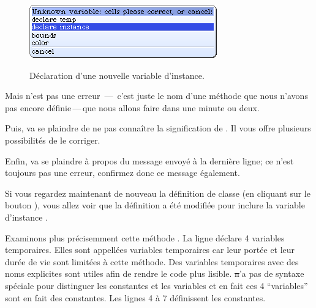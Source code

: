 \documentclass[a4paper,10pt,twoside]{book}
\begin{document}
\begin{figure}[htb]
\begin{minipage}{0.64\textwidth}
		{\includegraphics[scale=0.7]{DeclareInstanceVar}}
	\caption{Déclaration d'une nouvelle variable d'instance.\label{fig:declareInstance}}
\end{minipage}
\end{figure}

Mais  n'est pas une erreur \,---\, c'est juste le nom d'une méthode que nous n'avons pas encore définie\,---\,que nous allons faire dans une minute ou deux.


Puis, \squeak va se plaindre de ne pas connaître la signification de . Il vous offre plusieurs possibilités de le corriger.

Enfin, \squeak va se plaindre à propos du message  envoyé à la dernière ligne; ce n'est toujours pas une erreur, confirmez donc ce message également.

Si vous regardez maintenant de nouveau la définition de classe (en cliquant sur le bouton ), vous allez voir que la définition a été modifiée pour inclure la variable d'instance .

Examinons plus précisemment cette méthode .
La ligne  déclare 4 variables temporaires. Elles sont appellées variables temporaires car leur portée et leur durée de vie sont limitées à cette méthode. Des variables temporaires avec des noms explicites sont utiles afin de rendre le code plus lisible. \st n'a pas de syntaxe spéciale pour distinguer les constantes et les variables et en fait ces 4 ``variables'' sont en fait des constantes. Les lignes 4 à 7 définissent les constantes.
\end{document}
